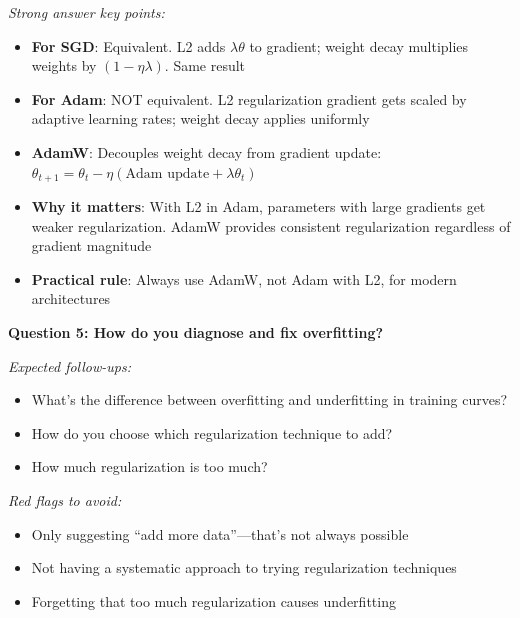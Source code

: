 \documentclass[../../main.tex]{subfiles}
\begin{document}
\begin{interviewquestions}
\textit{Strong answer key points:}
\begin{itemize}
    \item \textbf{For SGD}: Equivalent. L2 adds $\lambda\theta$ to gradient; weight decay multiplies weights by $(1-\eta\lambda)$. Same result
    \item \textbf{For Adam}: NOT equivalent. L2 regularization gradient gets scaled by adaptive learning rates; weight decay applies uniformly
    \item \textbf{AdamW}: Decouples weight decay from gradient update: $\theta_{t+1} = \theta_t - \eta(\text{Adam update} + \lambda\theta_t)$
    \item \textbf{Why it matters}: With L2 in Adam, parameters with large gradients get weaker regularization. AdamW provides consistent regularization regardless of gradient magnitude
    \item \textbf{Practical rule}: Always use AdamW, not Adam with L2, for modern architectures
\end{itemize}

\vspace{0.5em}
\textbf{Question 5: How do you diagnose and fix overfitting?}

\textit{Expected follow-ups:}
\begin{itemize}
    \item What's the difference between overfitting and underfitting in training curves?
    \item How do you choose which regularization technique to add?
    \item How much regularization is too much?
\end{itemize}

\textit{Red flags to avoid:}
\begin{itemize}
    \item Only suggesting ``add more data''---that's not always possible
    \item Not having a systematic approach to trying regularization techniques
    \item Forgetting that too much regularization causes underfitting
\end{itemize}


\end{interviewquestions}
\end{document}

